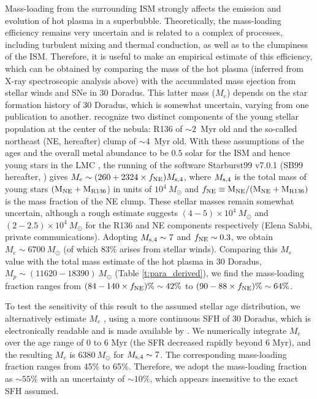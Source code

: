 \documentclass[usenatbib]{mnras}
\def\xs{30 Doradus}
\begin{document}
Mass-loading from the surrounding ISM strongly affects the emission and evolution of hot plasma in a superbubble. Theoretically, the mass-loading efficiency remains very uncertain and is related to a complex of processes, including turbulent mixing and thermal conduction,  as well as to the clumpiness of the ISM. Therefore, it is useful to make an empirical estimate of this efficiency, which can be obtained by comparing the mass of the hot plasma (inferred from X-ray spectroscopic analysis above) with the accumulated mass ejection from stellar winds and SNe in \xs. This latter mass ($M_{e}$) depends on the star formation history of \xs, which is somewhat uncertain, varying from one publication to another. \citet{Sabbi} recognize two distinct components of the young stellar population at the center of the nebula: R136 of $\sim 2$~Myr old and the so-called northeast (NE, hereafter) clump of $\sim 4$~Myr old. With these assumptions of the ages and the overall metal abundance to be $0.5$ solar for the ISM and hence young stars in the LMC \citep{Pellegrini11}, the running of the software Starburst99 v7.0.1 (SB99 hereafter, \citealt{Leitherer}) gives $M_{e} \sim (260+2324\times f_{\rm NE})M_{\rm s, 4}$, where $M_{\rm s, 4}$ is the total mass of young stars $(\rm{M}_{\rm NE}+\rm{M}_{\rm R136}$) in units of $10^4~M_{\odot}$ and $f_{\rm NE} \equiv \rm{M}_{\rm NE}/(\rm{M}_{\rm NE}+\rm{M}_{\rm R136})$ is the mass fraction of the NE clump.
These stellar masses remain somewhat uncertain, although a rough estimate suggests $(4-5)\times10^4~M_{\odot}$ and $(2-2.5)\times10^4~M_{\odot}$ for the R136 and NE components respectively (Elena Sabbi, private communications). Adopting $M_{\rm s, 4} \sim 7$ and $f_{\rm NE} \sim 0.3$, we obtain $M_{e} \sim 6700~M_{\odot}$ (of which $83\%$ arises from stellar winds). Comparing this $M_{e}$ value with the total mass estimate of the hot plasma in \xs, $M_{p}\sim (11620-18390)~M_{\odot}$ (Table \ref{t:para_derived}), we find the mass-loading fraction ranges from $(84-140\times f_{\rm NE})\% \sim 42\%$ to $(90-88\times f_{\rm NE})\% \sim 64\%$. 

To test the sensitivity of this result to the assumed stellar age distribution, we alternatively estimate $M_{e}$ , using a more continuous SFH of \xs, which is electronically readable and is made available by \citet{Schneider}. We numerically integrate $M_{e}$ over the age range of 0 to 6 Myr (the SFR decreased  rapidly beyond 6 Myr), and the resulting $M_{e}$ is 6380$~M_{\odot}$ for $M_{\rm s, 4} \sim 7$. The corresponding mass-loading fraction ranges from 45\% to 65\%. Therefore, we adopt the mass-loading fraction as $\sim 55\%$ with an uncertainty of $\sim 10\%$, which appears insensitive to the exact SFH assumed.
\end{document}
